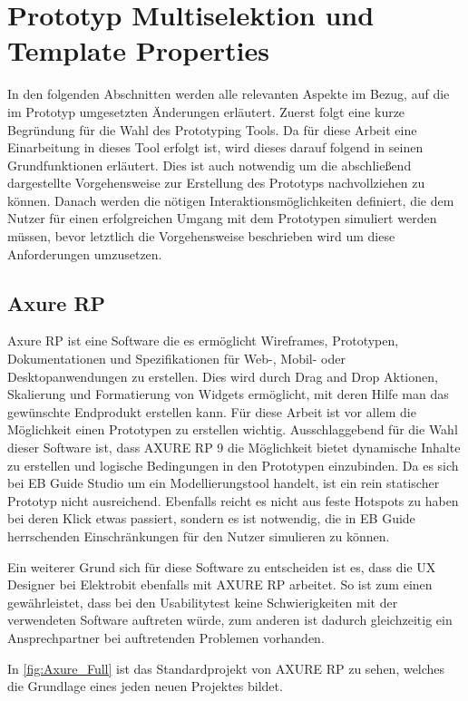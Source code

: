 \section {Prototyp Multiselektion und Template Properties}
In den folgenden Abschnitten werden alle relevanten Aspekte im Bezug, auf die im Prototyp umgesetzten Änderungen erläutert.
Zuerst folgt eine kurze Begründung für die Wahl des Prototyping Tools.
Da für diese Arbeit eine Einarbeitung in dieses Tool erfolgt ist, wird dieses darauf folgend in seinen Grundfunktionen erläutert.
Dies ist auch notwendig um die abschließend dargestellte Vorgehensweise zur Erstellung des Prototyps nachvollziehen zu können.
Danach werden die nötigen Interaktionsmöglichkeiten definiert, die dem Nutzer für einen erfolgreichen Umgang mit dem Prototypen simuliert werden müssen, bevor letztlich die Vorgehensweise beschrieben wird um diese Anforderungen umzusetzen.

\subsection {Axure RP}
Axure RP ist eine Software die es ermöglicht Wireframes, Prototypen, Dokumentationen und Spezifikationen für Web-, Mobil- oder Desktopanwendungen zu erstellen.
Dies wird durch Drag and Drop Aktionen, Skalierung und Formatierung von Widgets ermöglicht, mit deren Hilfe man das gewünschte Endprodukt erstellen kann.
Für diese Arbeit ist vor allem die Möglichkeit einen Prototypen zu erstellen wichtig.
Ausschlaggebend für die Wahl dieser Software ist, dass AXURE RP 9 die Möglichkeit bietet dynamische Inhalte zu erstellen und logische Bedingungen in den Prototypen einzubinden.
Da es sich bei EB Guide Studio um ein Modellierungstool handelt, ist ein rein statischer Prototyp nicht ausreichend.
Ebenfalls reicht es nicht aus feste Hotspots zu haben bei deren Klick etwas passiert, sondern es ist notwendig, die in EB Guide herrschenden Einschränkungen für den Nutzer simulieren zu können.

Ein weiterer Grund sich für diese Software zu entscheiden ist es, dass die UX Designer bei Elektrobit ebenfalls mit AXURE RP arbeitet.
So ist zum einen gewährleistet, dass bei den Usabilitytest keine Schwierigkeiten mit der verwendeten Software auftreten würde, zum anderen ist dadurch gleichzeitig ein Ansprechpartner bei auftretenden Problemen vorhanden.

In \cref{fig:Axure_Full} ist das Standardprojekt von AXURE RP zu sehen, welches die Grundlage eines jeden neuen Projektes bildet.

